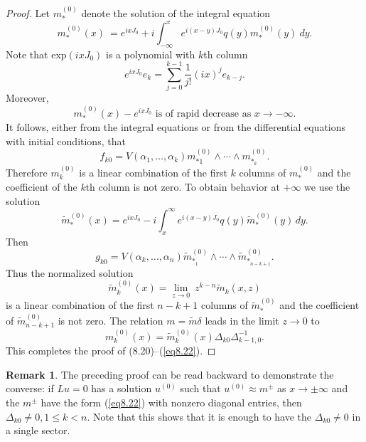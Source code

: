 \documentclass{surv-l}
\theoremstyle{plain}
\theoremstyle{definition}
\newtheorem{remark}[theorem]{Remark}
\numberwithin{equation}{chapter}
\begin{document}
\begin{proof} Let $m_{*}^{(0)}$ denote the solution of the integral equation
\begin{equation}\label{eq8.23}
m_{*}^{(0)}(x)\ =e^{i xJ_{0}}+i  \int_{-\infty}^{x}e^{i(x-y)J_{0}}q(y)m_{*}^{(0)}(y)\ dy.
\end{equation}
Note that exp$(ixJ_{0})$ is a polynomial with $k$th column
\begin{equation*}
e^{ixJ_{0}}e_{k}=\sum_{j=0}^{k-1}\frac{1}{j!}(ix)^{j}e_{k-j}.
\end{equation*}
Moreover,
\begin{equation*}
m_{*}^{(0)}(x)-e^{ixJ_{0}} \text{ is of rapid decrease as } x \rightarrow-\infty.
\end{equation*}
It follows, either from the integral equations or from the differential equations with initial conditions, that
\begin{equation*}
f_{k0}=V(\alpha_{1},\ldots, \alpha_{k})m_{*1}^{(0)}\wedge\cdots \wedge m_{*_{k}}^{(0)}.
\end{equation*}
Therefore $m_{k}^{(0)}$ is a linear combination of the first $k$ columns of $m_{*}^{(0)}$ and the coefficient of the $k$th column is not zero. To obtain behavior at $+\infty$ we use the solution
\begin{equation}\label{eq8.24}
\tilde{m}_{*}^{(0)}(x)=e^{ixJ_{0}}-i\int_{x}^{\infty}e^{i(x-y)J_{0}}q(y)\tilde{m}_{*}^{(0)}(y)\,dy.
\end{equation}
Then
\begin{equation*}
g_{k0}=V(\alpha_{k},\ldots, \alpha_{n})\tilde{m}_{*_{1}}^{(0)}\wedge\cdots \wedge\tilde{m}_{*_{n-k+1}}^{(0)}.
\end{equation*}
Thus the normalized solution
\begin{equation*}
\tilde{m}_{k}^{(0)}(x)=\lim_{z\rightarrow 0}\ z^{k-n}\tilde{m}_{k}(x,z)
\end{equation*}
is a linear combination of the first $n-k+1$ columns of $\tilde{m}_{*}^{(0)}$ and the coefficient of $\tilde{m}_{n-k+1}^{(0)}$ is not zero. The relation $ m=\tilde{m}\delta$ leads in the limit $z\rightarrow 0$ to
\begin{equation*}
m_{k}^{(0)}(x) =\tilde{m}_{k}^{(0)}(x)\Delta_{k0}\Delta_{k-1,0}^{-1}.
\end{equation*}
This completes the proof of (8.20)--(\ref{eq8.22}).
\end{proof}
\setcounter{theorem}{24}
\begin{remark}\label{rem8.25} The preceding proof can be read backward to demonstrate the converse: if $Lu=0$ has a solution $u^{(0)}$ such that $u^{(0)}\approx m^{\pm}$ as $ x\rightarrow\pm\infty$ and the $m^{\pm}$ have the form (\ref{eq8.22}) with nonzero diagonal entries, then $\Delta_{k0}\neq 0, 1\leq k<n$. Note that this shows that it is enough to have the $\Delta_{k0}\neq 0$ in a single sector.
\end{remark}
\end{document}
